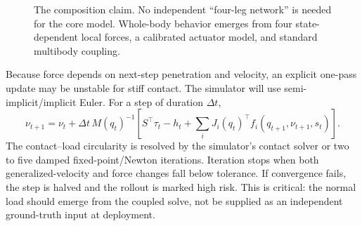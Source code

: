 \begin{figure}[ht]
\centering
{}
\caption{The composition claim. No independent ``four-leg network'' is needed for the core model. Whole-body behavior emerges from four state-dependent local forces, a calibrated actuator model, and standard multibody coupling.}
\label{fig:coupling}
\end{figure}

Because force depends on next-step penetration and velocity, an explicit one-pass update may be unstable for stiff contact. The simulator will use semi-implicit/implicit Euler. For a step of duration $\Delta t$,
\begin{equation}
\nu_{t+1}=\nu_t+\Delta t\,M(q_t)^{-1}
\left[S^\top\tau_t-h_t+\sum_iJ_i(q_t)^\top f_i(q_{t+1},\nu_{t+1},s_t)\right].
\label{eq:implicit}
\end{equation}
The contact--load circularity is resolved by the simulator's contact solver or two to five damped fixed-point/Newton iterations. Iteration stops when both generalized-velocity and force changes fall below tolerance. If convergence fails, the step is halved and the rollout is marked high risk. This is critical: the normal load should emerge from the coupled solve, not be supplied as an independent ground-truth input at deployment.

